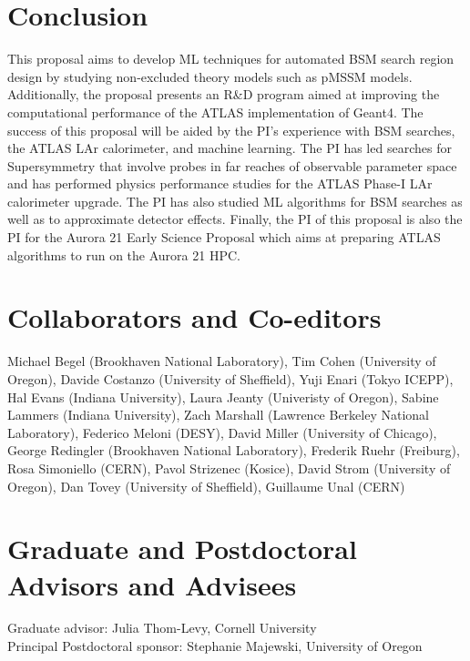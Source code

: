 \documentclass[letter, USenglish, 11pt]{article}
\begin{document}
\section*{Conclusion}
This proposal aims to develop ML techniques for automated BSM search region design by studying non-excluded theory models such as pMSSM models. Additionally, the proposal presents an R\&D program aimed at improving the computational performance of the ATLAS implementation of Geant4. The success of this proposal will be aided by the PI's experience with BSM searches, the ATLAS LAr calorimeter, and machine learning. The PI has led searches for Supersymmetry that involve probes in far reaches of observable parameter space and has performed physics performance studies for the ATLAS Phase-I LAr calorimeter upgrade. The PI has also studied ML algorithms for BSM searches as well as to approximate detector effects. Finally, the PI of this proposal is also the PI for the Aurora 21 Early Science Proposal which aims at preparing ATLAS algorithms to run on the Aurora 21 HPC.

\printbibliography
\clearpage
\section*{Collaborators and Co-editors}
Michael Begel (Brookhaven National Laboratory), Tim Cohen (University of Oregon), Davide Costanzo (University of Sheffield), Yuji Enari (Tokyo ICEPP), Hal Evans (Indiana University), Laura Jeanty (Univeristy of Oregon), Sabine Lammers (Indiana University), Zach Marshall (Lawrence Berkeley National Laboratory), Federico Meloni (DESY), David Miller (University of Chicago), George Redingler (Brookhaven National Laboratory), Frederik Ruehr (Freiburg), Rosa Simoniello (CERN), Pavol Strizenec (Kosice), David Strom (University of Oregon), Dan Tovey (University of Sheffield), Guillaume Unal (CERN)

\section*{Graduate and Postdoctoral Advisors and Advisees}
Graduate advisor: Julia Thom-Levy, Cornell University
\\Principal Postdoctoral sponsor: Stephanie Majewski, University of Oregon
\end{document}
